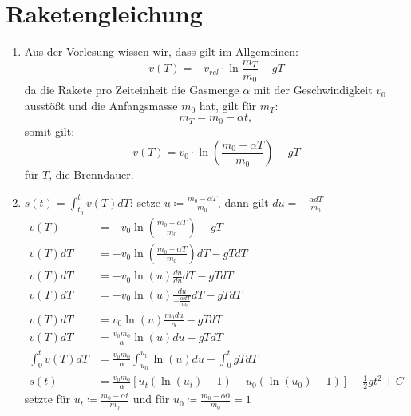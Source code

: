 \documentclass[sectionformat = aufgabe]{gadsescript}
\begin{document}
\section{Raketengleichung}
\begin{enumerate}[label=\alph*)]
	\item Aus der Vorlesung wissen wir, dass gilt im Allgemeinen:\\
		\[ v(T) = - v_{rel} \cdot \ln{\frac{m_T}{m_0}} - gT \]
		da die Rakete pro Zeiteinheit die Gasmenge $\alpha$ mit der Geschwindigkeit $v_0$ ausstößt und die Anfangsmasse $m_0$ hat, gilt für $m_T$:
		\[ m_T = m_0 - \alpha t, \]somit gilt:
		\[ v(T) = v_0 \cdot \ln(\frac{m_0 - \alpha T}{m_0}) - gT \]
		für $T$, die Brenndauer.
	\item $s(t) = \int_{t_0}^{t} v(T) dT$:
		setze $ u \coloneqq \frac{m_0 - \alpha T}{m_0} $, dann gilt $ du = - \frac{\alpha dT}{m_0} $
		\begin{align*}
			v(T) &= - v_0\ln(\frac{m_0 - \alpha T}{m_0}) - gT\\
			v(T)dT &= - v_0\ln(\frac{m_0 - \alpha T}{m_0})dT - gTdT\\
			v(T)dT &= - v_0\ln(u)\frac{du}{du}dT - gTdT\\
			v(T)dT &= - v_0\ln(u)\frac{du}{-\frac{\alpha dT}{m_0}}dT - gTdT\\
			v(T)dT &= v_0\ln(u)\frac{m_0du}{\alpha} - gTdT\\
			v(T)dT &= \frac{v_0m_0}{\alpha}\ln(u)du - gTdT\\
			\int_0^t v(T)dT &= \frac{v_0m_0}{\alpha}\int_{u_0}^{u_t}\ln(u)du - \int_0^t gTdT\\
			s(t) &= \frac{v_0m_0}{\alpha}\left[u_t(\ln(u_t) - 1) - u_0(\ln(u_0) - 1)\right] - \frac{1}{2}gt^2 + C
		\end{align*}
		setzte für $u_t \coloneqq \frac{m_0 - \alpha t}{m_0}$ und für $u_0 \coloneqq \frac{m_0 - \alpha 0}{m_0} = 1$


\end{enumerate}
\end{document}

